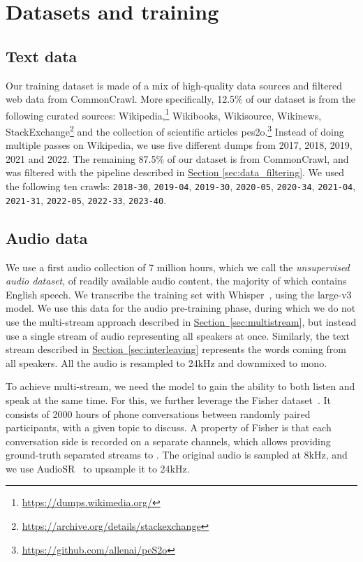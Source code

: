 \section{Datasets and training}
\label{sec:maindatasets}

\subsection{Text data}
\label{sec:text_dataset}
Our training dataset is made of a mix of high-quality data sources and filtered web data from CommonCrawl.
More specifically, 12.5\% of our dataset is from the following curated sources: Wikipedia,\footnote{\url{https://dumps.wikimedia.org/}} Wikibooks, Wikisource, Wikinews,
StackExchange\footnote{\url{https://archive.org/details/stackexchange}} and the collection of scientific articles pes2o.\footnote{\url{https://github.com/allenai/peS2o}}
Instead of doing multiple passes on Wikipedia, we use five different dumps from 2017, 2018, 2019, 2021 and 2022.
The remaining 87.5\% of our dataset is from CommonCrawl, and was filtered with the pipeline described in \hyperref[sec:data_filtering]{Section \ref{sec:data_filtering}}.
We used the following ten crawls: \texttt{2018-30}, \texttt{2019-04}, \texttt{2019-30}, \texttt{2020-05}, \texttt{2020-34}, \texttt{2021-04}, \texttt{2021-31}, \texttt{2022-05}, \texttt{2022-33}, \texttt{2023-40}.

\subsection{Audio data}
\label{sec:audio_data}
We use a first audio collection of 7 million hours, which we call the \emph{unsupervised audio dataset}, of readily available audio content, the majority
of which contains English speech. We transcribe the training set with Whisper~\citep{whisper}, using the large-v3 model. We use this data for the audio pre-training phase, during which we do not use the multi-stream approach described in \hyperref[sec:multistream]{Section~\ref{sec:multistream}}, but instead use a single stream of audio representing all speakers at once. Similarly, the text stream described in \hyperref[sec:interleaving]{Section~\ref{sec:interleaving}} represents the words coming from all speakers. All the audio is resampled to 24kHz and downmixed to mono.

To achieve multi-stream, we need the model to gain the ability to both listen and speak at the same time. For this, we further leverage the Fisher dataset~\citep{cieri2004fisher}. It consists of 2000 hours of
phone conversations between randomly paired participants, with a given topic to discuss. A property of Fisher is that each conversation side is recorded on a separate channels, which allows providing ground-truth separated streams to \ours{}. The original audio is sampled at 8kHz, and we use AudioSR~\citep{liu2023audiosr} to upsample it to 24kHz.

